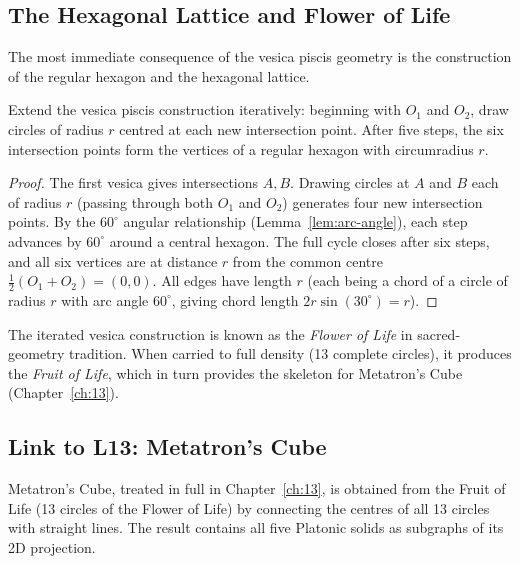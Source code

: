 \subsection{The Hexagonal Lattice and Flower of Life}
\label{subsec:ch11-hexagonal}

The most immediate consequence of the vesica piscis geometry is the
construction of the regular hexagon and the hexagonal lattice.

\begin{proposition}\label{prop:hexagon}
Extend the vesica piscis construction iteratively:
beginning with \(O_1\) and \(O_2\),
draw circles of radius \(r\) centred at each new intersection point.
After five steps, the six intersection points form the vertices of a
regular hexagon with circumradius \(r\).
\end{proposition}

\begin{proof}
The first vesica gives intersections \(A, B\).
Drawing circles at \(A\) and \(B\) each of radius \(r\) (passing through
both \(O_1\) and \(O_2\)) generates four new intersection points.
By the \(60^\circ\) angular relationship (Lemma~\ref{lem:arc-angle}),
each step advances by \(60^\circ\) around a central hexagon.
The full cycle closes after six steps, and all six vertices are at
distance \(r\) from the common centre \(\tfrac{1}{2}(O_1 + O_2) = (0,0)\).
All edges have length \(r\) (each being a chord of a circle of radius
\(r\) with arc angle \(60^\circ\), giving chord length
\(2r\sin(30^\circ) = r\)).
\end{proof}

The iterated vesica construction is known as the \emph{Flower of Life}
in sacred-geometry tradition.
When carried to full density (13 complete circles), it produces the
\emph{Fruit of Life}, which in turn provides the skeleton for
Metatron's Cube (Chapter~\ref{ch:13}).

\subsection{Link to L13: Metatron's Cube}
\label{subsec:ch11-metatron}

Metatron's Cube, treated in full in Chapter~\ref{ch:13}, is obtained
from the Fruit of Life (13 circles of the Flower of Life) by connecting
the centres of all 13 circles with straight lines.
The result contains all five Platonic solids as subgraphs of its
2D projection.

